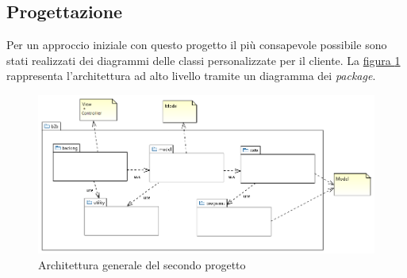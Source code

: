 \subsection{Progettazione}
Per un approccio iniziale con questo progetto il più consapevole possibile sono stati realizzati dei diagrammi delle classi personalizzate per il cliente. La \hyperref[fig:arch-p2]{figura \ref{fig:arch-p2}} rappresenta l'architettura ad alto livello tramite un diagramma dei \textit{package}.
\begin{figure}[H]
	\centering
	\includegraphics[width=\linewidth]{Immagini/p2/architettura.png}
	\caption{Architettura generale del secondo progetto}
	\label{fig:arch-p2}
\end{figure}

